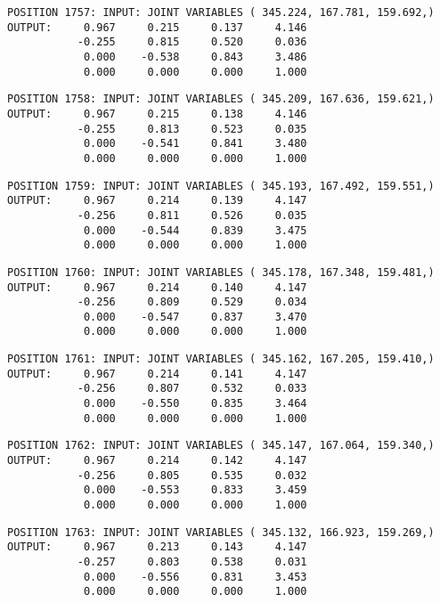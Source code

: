 \begin{verbatim}
POSITION 1757: INPUT: JOINT VARIABLES ( 345.224, 167.781, 159.692,)
OUTPUT:     0.967     0.215     0.137     4.146
           -0.255     0.815     0.520     0.036
            0.000    -0.538     0.843     3.486
            0.000     0.000     0.000     1.000
\end{verbatim} \pagebreak[1]\begin{verbatim}
POSITION 1758: INPUT: JOINT VARIABLES ( 345.209, 167.636, 159.621,)
OUTPUT:     0.967     0.215     0.138     4.146
           -0.255     0.813     0.523     0.035
            0.000    -0.541     0.841     3.480
            0.000     0.000     0.000     1.000
\end{verbatim} \pagebreak[1]\begin{verbatim}
POSITION 1759: INPUT: JOINT VARIABLES ( 345.193, 167.492, 159.551,)
OUTPUT:     0.967     0.214     0.139     4.147
           -0.256     0.811     0.526     0.035
            0.000    -0.544     0.839     3.475
            0.000     0.000     0.000     1.000
\end{verbatim} \pagebreak[1]\begin{verbatim}
POSITION 1760: INPUT: JOINT VARIABLES ( 345.178, 167.348, 159.481,)
OUTPUT:     0.967     0.214     0.140     4.147
           -0.256     0.809     0.529     0.034
            0.000    -0.547     0.837     3.470
            0.000     0.000     0.000     1.000
\end{verbatim} \pagebreak[1]\begin{verbatim}
POSITION 1761: INPUT: JOINT VARIABLES ( 345.162, 167.205, 159.410,)
OUTPUT:     0.967     0.214     0.141     4.147
           -0.256     0.807     0.532     0.033
            0.000    -0.550     0.835     3.464
            0.000     0.000     0.000     1.000
\end{verbatim} \pagebreak[1]\begin{verbatim}
POSITION 1762: INPUT: JOINT VARIABLES ( 345.147, 167.064, 159.340,)
OUTPUT:     0.967     0.214     0.142     4.147
           -0.256     0.805     0.535     0.032
            0.000    -0.553     0.833     3.459
            0.000     0.000     0.000     1.000
\end{verbatim} \pagebreak[1]\begin{verbatim}
POSITION 1763: INPUT: JOINT VARIABLES ( 345.132, 166.923, 159.269,)
OUTPUT:     0.967     0.213     0.143     4.147
           -0.257     0.803     0.538     0.031
            0.000    -0.556     0.831     3.453
            0.000     0.000     0.000     1.000
\end{verbatim} \pagebreak[1]\begin{verbatim}

\end{verbatim}
